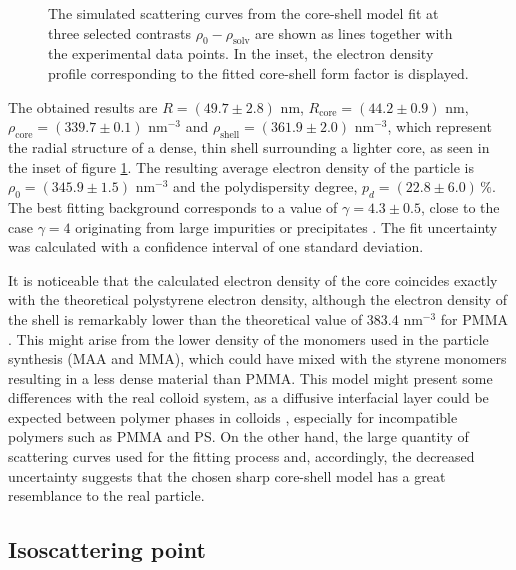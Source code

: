 \begin{figure}%
	\centering
		
		\caption[Core-shell model fit to the PS-COOH experimental data.]{The simulated scattering curves from the core-shell model fit at three selected contrasts $\rho_0-\rho_{\text{solv}}$ are shown as lines together with the experimental data points. In the inset, the electron density profile corresponding to the fitted core-shell form factor is displayed.}
		\label{fig:KiskerSAXSCoreshellFit}
\end{figure}

The obtained results are \(R=\left(49.7 \pm 2.8\right) \) nm, \(R_{\text{core}}=\left(44.2 \pm 0.9\right) \) nm, \(\rho_{\text{core}}=\left(339.7 \pm 0.1\right)\) nm\(^{-3}\) and \(\rho_{\text{shell}}=\left(361.9 \pm 2.0\right)\) nm\(^{-3}\), which represent the radial structure of a dense, thin shell surrounding a lighter core, as seen in the inset of figure \ref{fig:KiskerSAXSCoreshellFit}. The resulting average electron density of the particle is \(\rho_{0}=\left(345.9 \pm 1.5\right)\) nm\(^{-3}\) and the polydispersity degree, \(p_d=\left(22.8\pm 6.0\right)\,\%\). The best fitting background corresponds to a value of \( \gamma = 4.3\pm 0.5 \), close to the case \( \gamma = 4 \) originating from large impurities or precipitates \citep{pedersen_determination_1994}. The fit uncertainty was calculated with a confidence interval of one standard deviation. 

It is noticeable that the calculated electron density of the core coincides exactly with the theoretical polystyrene electron density, although the electron density of the shell is remarkably lower than the theoretical value of 383.4 nm\(^{-3}\) for PMMA \citep{ballauff_saxs_2001-1}. This might arise from the lower density of the monomers used in the particle synthesis (MAA and MMA), which could have mixed with the styrene monomers resulting in a less dense material than PMMA. This model might present some differences with the real colloid system, as a diffusive interfacial layer could be expected between polymer phases in colloids \citep{dingenouts_interface_1994}, especially for incompatible polymers such as PMMA and PS. On the other hand, the large quantity of scattering curves used for the fitting process and, accordingly, the decreased uncertainty suggests that the chosen sharp core-shell model has a great resemblance to the real particle.

\subsection{Isoscattering point}

